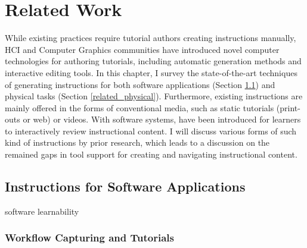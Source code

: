 
\chapter{Related Work}
\label{chapter_related_work}

While existing practices require tutorial authors creating instructions manually, HCI and Computer Graphics communities have introduced novel computer technologies for authoring tutorials, including automatic generation methods and interactive editing tools.
%
In this chapter, I survey the state-of-the-art techniques of generating instructions for both software applications (Section \ref{related_software}) and physical tasks (Section \ref{related_physical}).
%
Furthermore, existing instructions are mainly offered in the forms of conventional media, such as static tutorials (print-outs or web) or videos. With software systems,  have been introduced for learners to interactively review instructional content. I will discuss various forms of such kind of instructions by prior research, which leads to a discussion on the remained gaps in tool support for creating and navigating instructional content.


\section{Instructions for Software Applications}
\label{related_software}

software learnability~\cite{Grossman:2009:SSL:1518701.1518803}

\subsection{Workflow Capturing and Tutorials}

